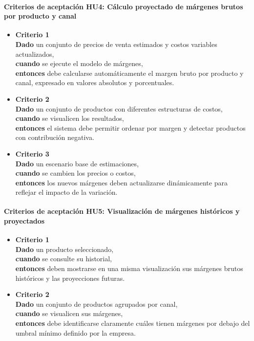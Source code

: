 \documentclass[
11pt, %
]{charter}
\begin{document}
\paragraph{Criterios de aceptación HU4: Cálculo proyectado de márgenes brutos por producto y canal}
\begin{itemize}
  \item \textbf{Criterio 1} \\
  \textbf{Dado} un conjunto de precios de venta estimados y costos variables actualizados, \\
  \textbf{cuando} se ejecute el modelo de márgenes, \\
  \textbf{entonces} debe calcularse automáticamente el margen bruto por producto y canal, expresado en valores absolutos y porcentuales.

  \item \textbf{Criterio 2} \\
  \textbf{Dado} un conjunto de productos con diferentes estructuras de costos, \\
  \textbf{cuando} se visualicen los resultados, \\
  \textbf{entonces} el sistema debe permitir ordenar por margen y detectar productos con contribución negativa.

  \item \textbf{Criterio 3} \\
  \textbf{Dado} un escenario base de estimaciones, \\
  \textbf{cuando} se cambien los precios o costos, \\
  \textbf{entonces} los nuevos márgenes deben actualizarse dinámicamente para reflejar el impacto de la variación.
\end{itemize}

\vspace{1em}

\paragraph{Criterios de aceptación HU5: Visualización de márgenes históricos y proyectados}
\begin{itemize}
  \item \textbf{Criterio 1} \\
  \textbf{Dado} un producto seleccionado, \\
  \textbf{cuando} se consulte su historial, \\
  \textbf{entonces} deben mostrarse en una misma visualización sus márgenes brutos históricos y las proyecciones futuras.

  \item \textbf{Criterio 2} \\
  \textbf{Dado} un conjunto de productos agrupados por canal, \\
  \textbf{cuando} se visualicen sus márgenes, \\
  \textbf{entonces} debe identificarse claramente cuáles tienen márgenes por debajo del umbral mínimo definido por la empresa.
\end{itemize}
\end{document}
